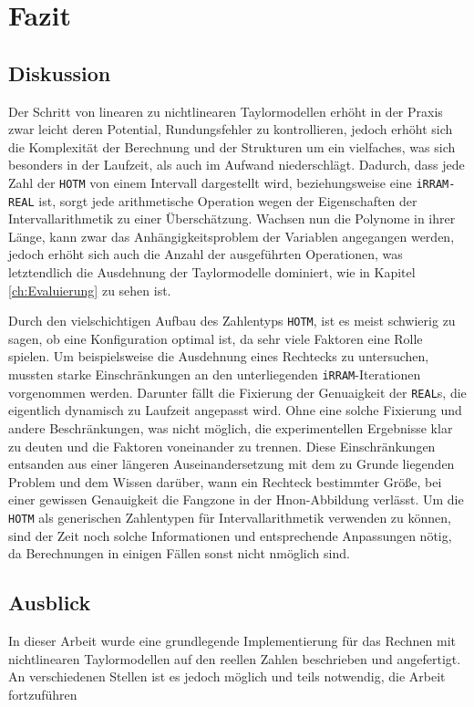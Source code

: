 
\chapter{Fazit}
\label{ch:fazit}

\section{Diskussion}
Der Schritt von linearen zu nichtlinearen Taylormodellen erhöht in der Praxis zwar leicht deren Potential, Rundungsfehler zu kontrollieren, jedoch erhöht sich die Komplexität der Berechnung und der Strukturen um ein vielfaches, was sich besonders in der Laufzeit, als auch im Aufwand niederschlägt. Dadurch, dass jede Zahl der \verb+HOTM+ von einem Intervall dargestellt wird, beziehungsweise eine \verb+iRRAM-REAL+ ist, sorgt jede arithmetische Operation wegen der Eigenschaften der Intervallarithmetik zu einer Überschätzung. Wachsen nun die Polynome in ihrer Länge, kann zwar das Anhängigkeitsproblem der Variablen angegangen werden, jedoch erhöht sich auch die Anzahl der ausgeführten Operationen, was letztendlich die Ausdehnung der Taylormodelle dominiert, wie in Kapitel \ref{ch:Evaluierung} zu sehen ist. 

Durch den vielschichtigen Aufbau des Zahlentyps \verb+HOTM+, ist es meist schwierig zu sagen, ob eine Konfiguration optimal ist, da sehr viele Faktoren eine Rolle spielen. Um beispielsweise die Ausdehnung eines Rechtecks zu untersuchen, mussten starke Einschränkungen an den unterliegenden \verb+iRRAM+-Iterationen vorgenommen werden. Darunter fällt die Fixierung der Genuaigkeit der \verb+REAL+s, die eigentlich dynamisch zu Laufzeit angepasst wird. Ohne eine solche Fixierung und andere Beschränkungen, was nicht möglich, die experimentellen Ergebnisse klar zu deuten und die Faktoren voneinander zu trennen. Diese Einschränkungen entsanden aus einer längeren Auseinandersetzung mit dem zu Grunde liegenden Problem und dem Wissen darüber, wann ein Rechteck bestimmter Größe, bei einer gewissen Genauigkeit die Fangzone in der H\e non-Abbildung verlässt. Um die \verb+HOTM+ als generischen Zahlentypen für Intervallarithmetik verwenden zu können, sind der Zeit noch solche Informationen und entsprechende Anpassungen nötig, da Berechnungen in einigen Fällen sonst nicht nmöglich sind.


\section{Ausblick}
In dieser Arbeit wurde eine grundlegende Implementierung für das Rechnen mit nichtlinearen Taylormodellen auf den reellen Zahlen beschrieben und angefertigt. An verschiedenen Stellen ist es jedoch möglich und teils notwendig, die Arbeit fortzuführen

